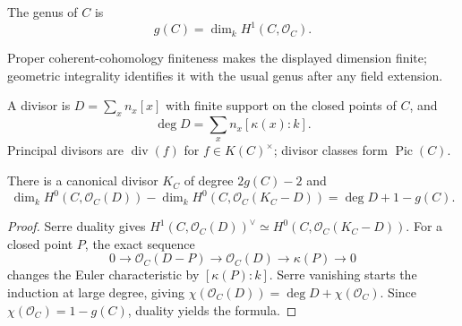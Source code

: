 \begin{definition}[Genus]
  \label{pa-def-genus}
  \cite{milne-av,kleiman-picard}
  The genus of \(C\) is
  \[
    g(C)=\dim_k H^1(C,\mathcal O_C).
  \]
\end{definition}

Proper coherent-cohomology finiteness makes the displayed dimension finite;
geometric integrality identifies it with the usual genus after any field
extension.

\begin{definition}
  \label{pa-def-divisors}
  \cite{hartshorne-ag,papaioannou-rr}
  A divisor is \(D=\sum_xn_x[x]\) with finite support on the closed points of
  \(C\), and
  \[
    \deg D=\sum_xn_x[\kappa(x):k].
  \]
  Principal divisors are \(\operatorname{div}(f)\) for
  \(f\in K(C)^\times\); divisor classes form \(\operatorname{Pic}(C)\).
\end{definition}

\begin{theorem}
  \label{pa-thm-riemann-roch}
  \cite{hartshorne-ag,papaioannou-rr}
  There is a canonical divisor \(K_C\) of degree \(2g(C)-2\) and
  \[
    \dim_kH^0(C,\mathcal O_C(D))-
    \dim_kH^0(C,\mathcal O_C(K_C-D))
    =\deg D+1-g(C).
  \]
\end{theorem}

\begin{proof}
  Serre duality gives
  \(H^1(C,\mathcal O_C(D))^\vee\simeq
  H^0(C,\mathcal O_C(K_C-D))\).  For a closed point \(P\), the exact sequence
  \[
    0\longrightarrow\mathcal O_C(D-P)\longrightarrow\mathcal O_C(D)
    \longrightarrow\kappa(P)\longrightarrow0
  \]
  changes the Euler characteristic by \([\kappa(P):k]\).  Serre vanishing
  starts the induction at large degree, giving
  \(\chi(\mathcal O_C(D))=\deg D+\chi(\mathcal O_C)\).  Since
  \(\chi(\mathcal O_C)=1-g(C)\), duality yields the formula.
\end{proof}
